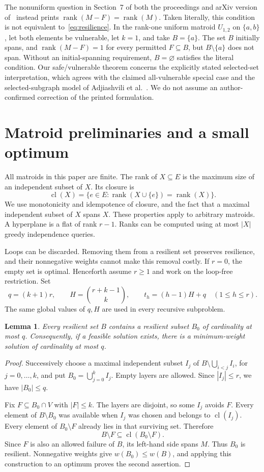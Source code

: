 \documentclass[11pt]{article}
\newtheorem{lemma}[theorem]{Lemma}
\theoremstyle{definition}\newtheorem{definition}[theorem]{Definition}
\theoremstyle{remark}\newtheorem{remark}[theorem]{Remark}
\DeclareMathOperator{\rk}{rank}
\DeclareMathOperator{\cl}{cl}
\begin{document}
The nonuniform question in Section~7 of both the proceedings and arXiv version of~\cite{BFGL} instead prints $\rk(M-F)=\rk(M)$. Taken literally, this condition is not equivalent to~\eqref{eq:resilience}. In the rank-one uniform matroid $U_{1,2}$ on $\{a,b\}$, let both elements be vulnerable, let $k=1$, and take $B=\{a\}$. The set $B$ initially spans, and $\rk(M-F)=1$ for every permitted $F\subseteq B$, but $B\setminus\{a\}$ does not span. Without an initial-spanning requirement, $B=\varnothing$ satisfies the literal condition. Our safe/vulnerable theorem concerns the explicitly stated selected-set interpretation, which agrees with the claimed all-vulnerable special case and the selected-subgraph model of Adjiashvili et al.~\cite{AHMS}. We do not assume an author-confirmed correction of the printed formulation.

\section{Matroid preliminaries and a small optimum}
All matroids in this paper are finite. The rank of $X\subseteq E$ is the maximum size of an independent subset of $X$. Its closure is
\[
 \cl(X)=\{e\in E:\rk(X\cup\{e\})=\rk(X)\}.
\]
We use monotonicity and idempotence of closure, and the fact that a maximal independent subset of $X$ spans $X$. These properties apply to arbitrary matroids. A hyperplane is a flat of rank $r-1$. Ranks can be computed using at most $|X|$ greedy independence queries.

Loops can be discarded. Removing them from a resilient set preserves resilience, and their nonnegative weights cannot make this removal costly. If $r=0$, the empty set is optimal. Henceforth assume $r\geq1$ and work on the loop-free restriction. Set
\begin{equation}\label{eq:parameters}
 q=(k+1)r,\qquad H=\binom{r+k-1}{k},\qquad t_h=(h-1)H+q\quad(1\leq h\leq r).
\end{equation}
The same global values of $q,H$ are used in every recursive subproblem.

\begin{lemma}\label{lem:small}
Every resilient set $B$ contains a resilient subset $B_0$ of cardinality at most $q$. Consequently, if a feasible solution exists, there is a minimum-weight solution of cardinality at most $q$.
\end{lemma}
\begin{proof}
Successively choose a maximal independent subset $I_j$ of $B\setminus\bigcup_{i<j}I_i$, for $j=0,\ldots,k$, and put $B_0=\bigcup_{j=0}^{k}I_j$. Empty layers are allowed. Since $|I_j|\leq r$, we have $|B_0|\leq q$.

Fix $F\subseteq B_0\cap V$ with $|F|\leq k$. The layers are disjoint, so some $I_j$ avoids $F$. Every element of $B\setminus B_0$ was available when $I_j$ was chosen and belongs to $\cl(I_j)$. Every element of $B_0\setminus F$ already lies in that surviving set. Therefore
\[
 B\setminus F\subseteq \cl(B_0\setminus F).
\]
Since $F$ is also an allowed failure of $B$, its left-hand side spans $M$. Thus $B_0$ is resilient. Nonnegative weights give $w(B_0)\leq w(B)$, and applying this construction to an optimum proves the second assertion.
\end{proof}
\end{document}
